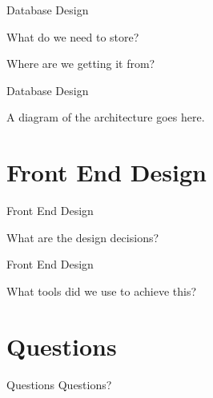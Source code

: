 \documentclass{beamer}
\begin{document}
\begin{frame}{Database Design}

What do we need to store?

Where are we getting it from?

\end{frame}


\begin{frame}{Database Design}

A diagram of the architecture goes here.

\end{frame}

\section{Front End Design}

\begin{frame}{Front End Design}

What are the design decisions?

\end{frame}

\begin{frame}{Front End Design}

What tools did we use to achieve this?

\end{frame}

\section*{Questions}
\begin{frame}{Questions}
\centering
Questions?
\end{frame}
\end{document}
